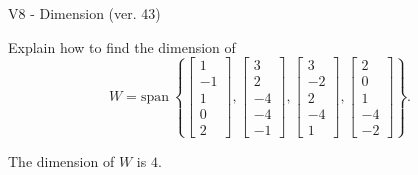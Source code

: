 \begin{exercise}
  \begin{exerciseTitle}V8 - Dimension (ver. 43)\end{exerciseTitle}
  \begin{exerciseStatement}
    Explain how to find the dimension of 
\[W=\mathrm{span}\ \left\{\left[\begin{array}{r}
1 \\
-1 \\
1 \\
0 \\
2
\end{array}\right] , \left[\begin{array}{r}
3 \\
2 \\
-4 \\
-4 \\
-1
\end{array}\right] , \left[\begin{array}{r}
3 \\
-2 \\
2 \\
-4 \\
1
\end{array}\right] , \left[\begin{array}{r}
2 \\
0 \\
1 \\
-4 \\
-2
\end{array}\right]\right\}.\]



  \end{exerciseStatement}
  \begin{exerciseAnswer}
   The dimension of \(W\) is  \(4\).
  


  \end{exerciseAnswer}
\end{exercise}